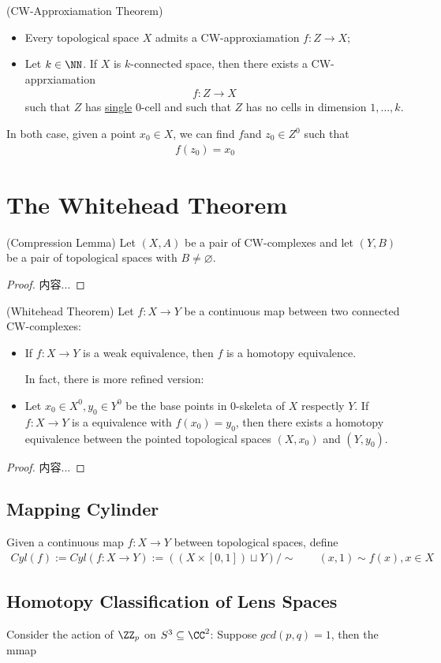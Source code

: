 \documentclass[Total.tex]{subfiles}
\begin{document}
	\begin{theorem}
		(CW-Approxiamation Theorem)
		\begin{itemize}
			\item Every topological space $X$ admits a CW-approxiamation $f:Z\rightarrow X$;
			\item Let $k\in \NN$. If $X$ is $k$-connected space, then there exists a CW-apprxiamation  
			\begin{gather*}
				f:Z\rightarrow X
			\end{gather*}
			such that $Z$ has \underline{single} $0$-cell and such that $Z$ has no cells in dimension $1,\dots,k$.
		\end{itemize}
		In both case, given a point $x_0\in X$, we can find $f$and $z_0\in Z^0$ such that
		\begin{gather*}
			f(z_0)=x_0
		\end{gather*}
	\end{theorem}
	\section{The Whitehead Theorem}
	\begin{lemma}
		(Compression Lemma) Let $(X,A)$ be a pair of CW-complexes and let $(Y,B)$ be a pair of topological spaces with $B\not=\varnothing.$ 
		
		
	\end{lemma}
	\begin{proof}
		内容...
	\end{proof}
	\begin{theorem}
		
		(Whitehead Theorem) Let $f:X\rightarrow Y$ be a continuous map between two connected CW-complexes:
		\begin{itemize}
			\item If $f:X\rightarrow Y$ is a weak equivalence, then $f$ is a homotopy equivalence.
			
			In fact, there is more refined version:
			\item Let $x_0\in X^0,y_0\in Y^0$ be the base points in $0$-skeleta of $X$ respectly $Y$. If $f:X\rightarrow Y$ is a equivalence with $f(x_0)=y_0$, then there exists a homotopy equivalence between the pointed topological spaces $(X,x_0)$ and $(Y,y_0)$.
		\end{itemize}
	\end{theorem}
	\begin{proof}
		内容...
	\end{proof}
	\subsection{Mapping Cylinder}
	\begin{Def}
		Given a continuous map $f:X\rightarrow Y$ between topological spaces, define
		\begin{gather*}
			Cyl(f):=Cyl(f:X\rightarrow Y):=((X\times [0,1])\sqcup Y)/\sim\qquad (x,1)\sim f(x),x\in X
		\end{gather*}
	\end{Def}
	\subsection{Homotopy Classification of Lens Spaces}
	\begin{Def}
		Consider the action of $\ZZ_p$ on $S^3\subseteq \CC^2$: Suppose $gcd(p,q)=1$, then the mmap
	\end{Def}
\end{document}
